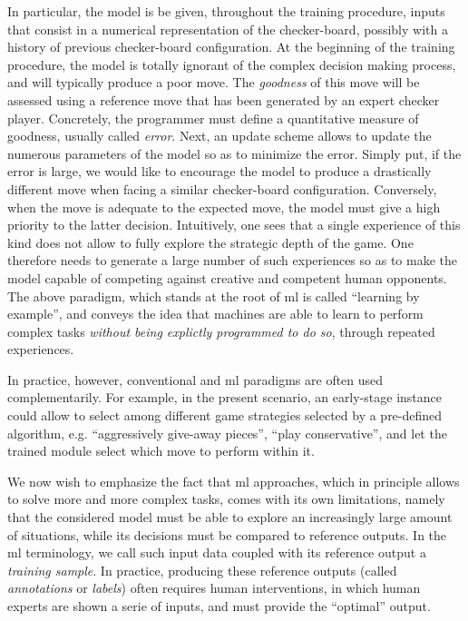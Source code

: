 In particular, the model is be given, throughout the training procedure, inputs that consist in a numerical representation of the checker-board, possibly with a history of previous checker-board configuration.
At the beginning of the training procedure, the model is totally ignorant of the complex decision making process, and will typically produce a poor move.
The \textit{goodness} of this move will be assessed using a reference move that has been generated by an expert checker player.
Concretely, the programmer must define a quantitative measure of goodness, usually called \textit{error}.
Next, an update scheme allows to update the numerous parameters of the model so as to minimize the error.
Simply put, if the error is large, we would like to encourage the model to produce a drastically different move when facing a similar checker-board configuration.
Conversely, when the move is adequate to the expected move, the model must give a high priority to the latter decision.
Intuitively, one sees that a single experience of this kind does not allow to fully explore the strategic depth of the game.
One therefore needs to generate a large number of such experiences so as to make the model capable of competing against creative and competent human opponents.
The above paradigm, which stands at the root of \gls{ml} is called ``learning by example'', and conveys the idea that machines are able to learn to perform complex tasks \textit{without being explictly programmed to do so}, through repeated experiences.

In practice, however, conventional and \gls{ml} paradigms are often used complementarily.
For example, in the present scenario, an early-stage instance could allow to select among different game strategies selected by a pre-defined algorithm, e.g. ``aggressively give-away pieces'', ``play conservative'', and let the trained module select which move to perform within it.

We now wish to emphasize the fact that \gls{ml} approaches, which in principle allows to solve more and more complex tasks, comes with its own limitations, namely that the considered model must be able to explore an increasingly large amount of situations, while its decisions must be compared to reference outputs.
In the \gls{ml} terminology, we call such input data coupled with its reference output a \textit{training sample}.
In practice, producing these reference outputs (called \textit{annotations} or \textit{labels}) often requires human interventions, in which human experts
are shown a serie of inputs, and must provide the ``optimal'' output.

